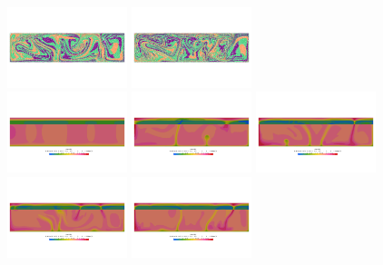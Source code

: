 \begin{center}
\includegraphics[width=3.5cm]{python_codes/fieldstone_88/results/model1/m0014.png}
\includegraphics[width=3.5cm]{python_codes/fieldstone_88/results/model1/m0019.png}\\
\includegraphics[width=3.5cm]{python_codes/fieldstone_88/results/model1/v0000.png}
\includegraphics[width=3.5cm]{python_codes/fieldstone_88/results/model1/v0004.png}
\includegraphics[width=3.5cm]{python_codes/fieldstone_88/results/model1/v0009.png}
\includegraphics[width=3.5cm]{python_codes/fieldstone_88/results/model1/v0014.png}
\includegraphics[width=3.5cm]{python_codes/fieldstone_88/results/model1/v0019.png}\\

\end{center}
